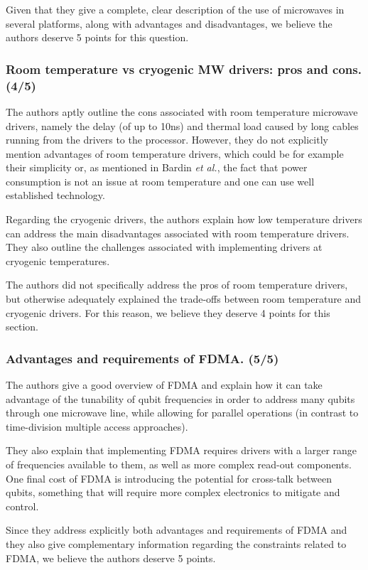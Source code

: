 \documentclass[11pt]{article}
\begin{document}
Given that they give a complete, clear description of the use of microwaves in
several platforms, along with advantages and disadvantages, we believe the
authors deserve 5 points for this question.

\subsubsection{Room temperature vs cryogenic MW drivers: pros and cons. (4/5)}

The authors aptly outline the cons associated with room temperature microwave
drivers, namely the delay (of up to 10ns) and thermal load caused by long cables
running from the drivers to the processor. However, they do not explicitly
mention advantages of room temperature drivers, which could be for example their
simplicity or, as mentioned in Bardin \emph{et al.}, the fact that power
consumption is not an issue at room temperature and one can use well established
technology.

Regarding the cryogenic drivers, the authors explain how low temperature drivers
can address the main disadvantages associated with room temperature drivers.
They also outline the challenges associated with implementing drivers at
cryogenic temperatures.

The authors did not specifically address the pros of room
temperature drivers, but otherwise adequately explained the
trade-offs between room temperature and cryogenic drivers. For
this reason, we believe they deserve 4 points for this section.

\subsubsection{Advantages and requirements of FDMA. (5/5)}

The authors give a good overview of FDMA and explain how it can take advantage
of the tunability of qubit frequencies in order to address many qubits through
one microwave line, while allowing for parallel operations (in contrast to
time-division multiple access approaches).

They also explain that implementing FDMA requires drivers with a larger range of
frequencies available to them, as well as more complex read-out components. One
final cost of FDMA is introducing the potential for cross-talk between qubits,
something that will require more complex electronics to mitigate and control.

Since they address explicitly both advantages and requirements of FDMA and they
also give complementary information regarding the constraints related to FDMA,
we believe the authors deserve 5 points.
\end{document}

